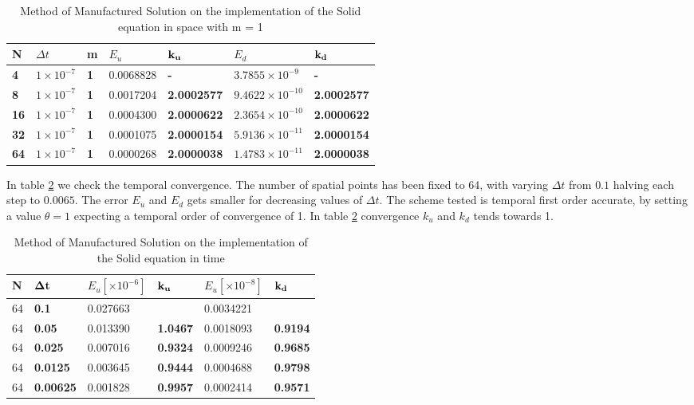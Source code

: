 \begin{table}[H]
\centering
\caption{Method of Manufactured Solution on the implementation of the Solid equation in space with m = 1}
\label{tab:MMS_SOLID_SPACE}
\begin{tabular}{|l|l|l|l|l|l|l|}
\hline
\textbf{N} & $\Delta t$ & \textbf{m} & $E_u $ & $\bold{k_u}$ & $E_d $ & $\bold{k_d}$ \\ \hline
\textbf{4} & $1\times10^{-7}$ & \textbf{1} & 0.0068828 & \textbf{-} & $3.7855 \times 10^{-9} $ & \textbf{-} \\ \hline
\textbf{8} & $1\times10^{-7}$ & \textbf{1} & 0.0017204 & \textbf{2.0002577} & $9.4622 \times 10^{-10} $ & \textbf{2.0002577} \\ \hline
\textbf{16} & $1\times10^{-7}$ & \textbf{1} & 0.0004300 & \textbf{2.0000622} & $2.3654 \times 10^{-10} $ & \textbf{2.0000622} \\ \hline
\textbf{32} & $1\times10^{-7}$ & \textbf{1} & 0.0001075 & \textbf{2.0000154} & $5.9136 \times 10^{-11} $ & \textbf{2.0000154} \\ \hline
\textbf{64} & $1\times10^{-7}$ & \textbf{1} & 0.0000268 & \textbf{2.0000038} & $1.4783 \times 10^{-11} $ & \textbf{2.0000038} \\ \hline
\end{tabular}
\end{table}

In table \ref{tab:MMS_SOLID_TIME} we check the temporal convergence. The number of spatial points has been fixed to 64, with varying $\Delta t $ from $0.1$ halving each step to $0.0065$. The error $E_u$ and $E_d$ gets smaller for decreasing values of $\Delta t$. The scheme tested is temporal first order accurate, by setting a value $\theta = 1$ expecting a temporal order of convergence of 1. In table \ref{tab:MMS_SOLID_TIME} convergence $k_u$ and $k_d$ tends towards 1.

\begin{table}[H]
\centering
\caption{Method of Manufactured Solution on the implementation of the Solid equation in time}
\label{tab:MMS_SOLID_TIME}
\begin{tabular}{|l|l|l|l|l|l|}
\hline
N & $\bold{\Delta t}$ & $E_u [\times10^{-6}]$ & $\bold{k_u}$ & $E_u [\times10^{-8}]$ & $\bold{k_d}$ \\ \hline
64 & \textbf{0.1} & 0.027663 & \textbf{} & 0.0034221 & \textbf{} \\ \hline
64 & \textbf{0.05} & 0.013390 & \textbf{1.0467} & 0.0018093 & \textbf{0.9194} \\ \hline
64 & \textbf{0.025} & 0.007016 & \textbf{0.9324} & 0.0009246 & \textbf{0.9685} \\ \hline
64 & \textbf{0.0125} & 0.003645 & \textbf{0.9444} & 0.0004688 & \textbf{0.9798} \\ \hline
64 & \textbf{0.00625} & 0.001828 & \textbf{0.9957} & 0.0002414 & \textbf{0.9571} \\ \hline
\end{tabular}
\end{table}

